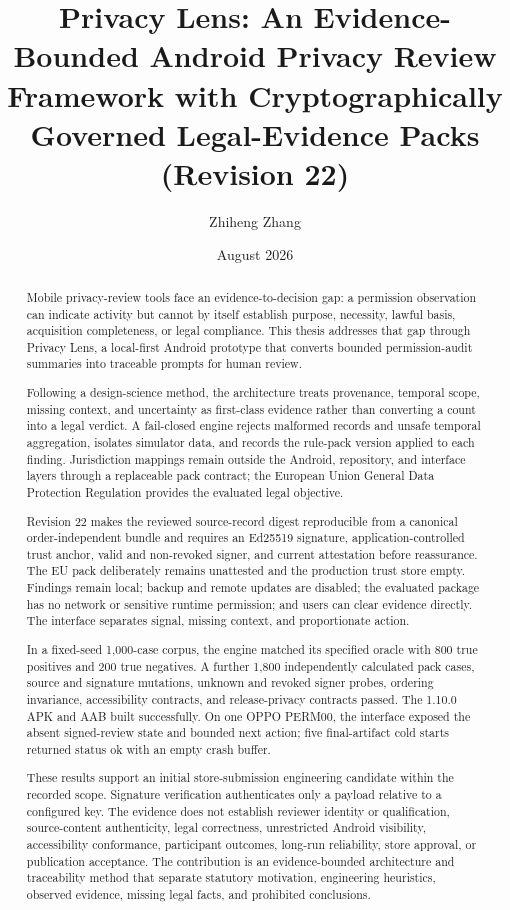 \documentclass[11pt,a4paper]{article}
\title{Privacy Lens: An Evidence-Bounded Android Privacy Review Framework with Cryptographically Governed Legal-Evidence Packs (Revision 22)}
\author{Zhiheng Zhang}
\date{August 2026}
\begin{document}
\maketitle
\begin{abstract}
\small\singlespacing
Mobile privacy-review tools face an evidence-to-decision gap: a permission observation can indicate activity but cannot by itself establish purpose, necessity, lawful basis, acquisition completeness, or legal compliance. This thesis addresses that gap through Privacy Lens, a local-first Android prototype that converts bounded permission-audit summaries into traceable prompts for human review.

Following a design-science method, the architecture treats provenance, temporal scope, missing context, and uncertainty as first-class evidence rather than converting a count into a legal verdict. A fail-closed engine rejects malformed records and unsafe temporal aggregation, isolates simulator data, and records the rule-pack version applied to each finding. Jurisdiction mappings remain outside the Android, repository, and interface layers through a replaceable pack contract; the European Union General Data Protection Regulation provides the evaluated legal objective.

Revision 22 makes the reviewed source-record digest reproducible from a canonical order-independent bundle and requires an Ed25519 signature, application-controlled trust anchor, valid and non-revoked signer, and current attestation before reassurance. The EU pack deliberately remains unattested and the production trust store empty. Findings remain local; backup and remote updates are disabled; the evaluated package has no network or sensitive runtime permission; and users can clear evidence directly. The interface separates signal, missing context, and proportionate action.

In a fixed-seed 1,000-case corpus, the engine matched its specified oracle with 800 true positives and 200 true negatives. A further 1,800 independently calculated pack cases, source and signature mutations, unknown and revoked signer probes, ordering invariance, accessibility contracts, and release-privacy contracts passed. The 1.10.0 APK and AAB built successfully. On one OPPO PERM00, the interface exposed the absent signed-review state and bounded next action; five final-artifact cold starts returned status ok with an empty crash buffer.

These results support an initial store-submission engineering candidate within the recorded scope. Signature verification authenticates only a payload relative to a configured key. The evidence does not establish reviewer identity or qualification, source-content authenticity, legal correctness, unrestricted Android visibility, accessibility conformance, participant outcomes, long-run reliability, store approval, or publication acceptance. The contribution is an evidence-bounded architecture and traceability method that separate statutory motivation, engineering heuristics, observed evidence, missing legal facts, and prohibited conclusions.
\end{abstract}
\end{document}
